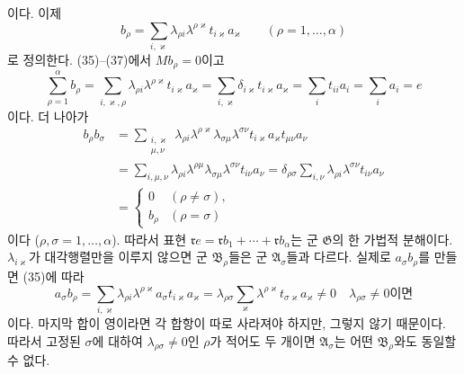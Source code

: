 이다. 이제
\begin{equation}
 b_\rho=\sum_{i,\varkappa}
 \lambda_{\rho i}\lambda^{\rho\varkappa}
 t_{i\varkappa}a_\varkappa
 \qquad(\rho=1,\ldots,\alpha)
\tag{37}
\end{equation}
로 정의한다. (35)--(37)에서 \(Mb_\rho=0\)이고
\begin{equation}
 \sum_{\rho=1}^{\alpha}b_\rho
 =\sum_{i,\varkappa,\rho}
  \lambda_{\rho i}\lambda^{\rho\varkappa}
  t_{i\varkappa}a_\varkappa
 =\sum_{i,\varkappa}\delta_{i\varkappa}
  t_{i\varkappa}a_\varkappa
 =\sum_i t_{ii}a_i=\sum_i a_i=e
\tag{38}
\end{equation}
이다. 더 나아가
\[
\begin{aligned}
 b_\rho b_\sigma
 &=\sum_{\substack{i,\varkappa\\ \mu,\nu}}
  \lambda_{\rho i}\lambda^{\rho\varkappa}
  \lambda_{\sigma\mu}\lambda^{\sigma\nu}
  t_{i\varkappa}a_\varkappa t_{\mu\nu}a_\nu\\
 &=\sum_{i,\mu,\nu}
  \lambda_{\rho i}\lambda^{\rho\mu}
  \lambda_{\sigma\mu}\lambda^{\sigma\nu}
  t_{i\nu}a_\nu
 =\delta_{\rho\sigma}\sum_{i,\nu}
  \lambda_{\rho i}\lambda^{\sigma\nu}t_{i\nu}a_\nu\\
 &=\begin{cases}0&(\rho\ne\sigma),\\ b_\rho&(\rho=\sigma)\end{cases}
\end{aligned}
\]
이다 (\(\rho,\sigma=1,\ldots,\alpha\)). 따라서 표현 \(\mathfrak r e=\mathfrak r b_1+\cdots+\mathfrak r b_\alpha\)는 군 \(\mathfrak G\)의 한 가법적 분해이다. \(\lambda_{i\varkappa}\)가 대각행렬만을 이루지 않으면 군 \(\mathfrak B_\rho\)들은 군 \(\mathfrak A_\sigma\)들과 다르다. 실제로 \(a_\sigma b_\rho\)를 만들면 (35)에 따라
\[
 a_\sigma b_\rho
 =\sum_{i,\varkappa}\lambda_{\rho i}\lambda^{\rho\varkappa}
  a_\sigma t_{i\varkappa}a_\varkappa
 =\lambda_{\rho\sigma}\sum_\varkappa
  \lambda^{\rho\varkappa}t_{\sigma\varkappa}a_\varkappa
 \ne0
 \quad\text{\(\lambda_{\rho\sigma}\ne0\)이면}
\]
이다. 마지막 합이 영이라면 각 합항이 따로 사라져야 하지만, 그렇지 않기 때문이다. 따라서 고정된 \(\sigma\)에 대하여 \(\lambda_{\rho\sigma}\ne0\)인 \(\rho\)가 적어도 두 개이면 \(\mathfrak A_\sigma\)는 어떤 \(\mathfrak B_\rho\)와도 동일할 수 없다.

